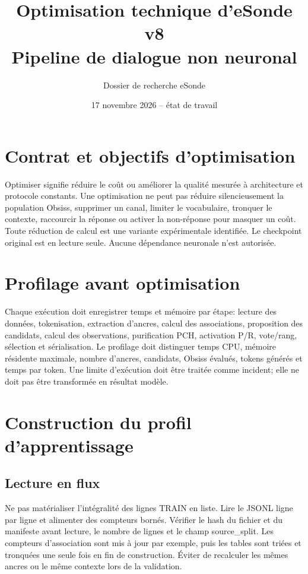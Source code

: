 \documentclass[11pt,a4paper]{report}
\title{Optimisation technique d'eSonde v8\\Pipeline de dialogue non neuronal}
\author{Dossier de recherche eSonde}
\date{17 novembre 2026 -- état de travail}
\begin{document}
\maketitle
\tableofcontents

\chapter{Contrat et objectifs d'optimisation}
Optimiser signifie réduire le coût ou améliorer la qualité mesurée à architecture et protocole constants. Une optimisation ne peut pas réduire silencieusement la population Obsiss, supprimer un canal, limiter le vocabulaire, tronquer le contexte, raccourcir la réponse ou activer la non-réponse pour masquer un coût. Toute réduction de calcul est une variante expérimentale identifiée. Le checkpoint original est en lecture seule. Aucune dépendance neuronale n'est autorisée.

\chapter{Profilage avant optimisation}
Chaque exécution doit enregistrer temps et mémoire par étape: lecture des données, tokenisation, extraction d'ancres, calcul des associations, proposition des candidats, calcul des observations, purification PCH, activation P/R, vote/rang, sélection et sérialisation. Le profilage doit distinguer temps CPU, mémoire résidente maximale, nombre d'ancres, candidats, Obsiss évalués, tokens générés et temps par token. Une limite d'exécution doit être traitée comme incident; elle ne doit pas être transformée en résultat modèle.

\chapter{Construction du profil d'apprentissage}
\section{Lecture en flux}
Ne pas matérialiser l'intégralité des lignes TRAIN en liste. Lire le JSONL ligne par ligne et alimenter des compteurs bornés. Vérifier le hash du fichier et du manifeste avant lecture, le nombre de lignes et le champ source\_split. Les compteurs d'association sont mis à jour par exemple, puis les tables sont triées et tronquées une seule fois en fin de construction. Éviter de recalculer les mêmes ancres ou le même contexte lors de la validation.
\end{document}
